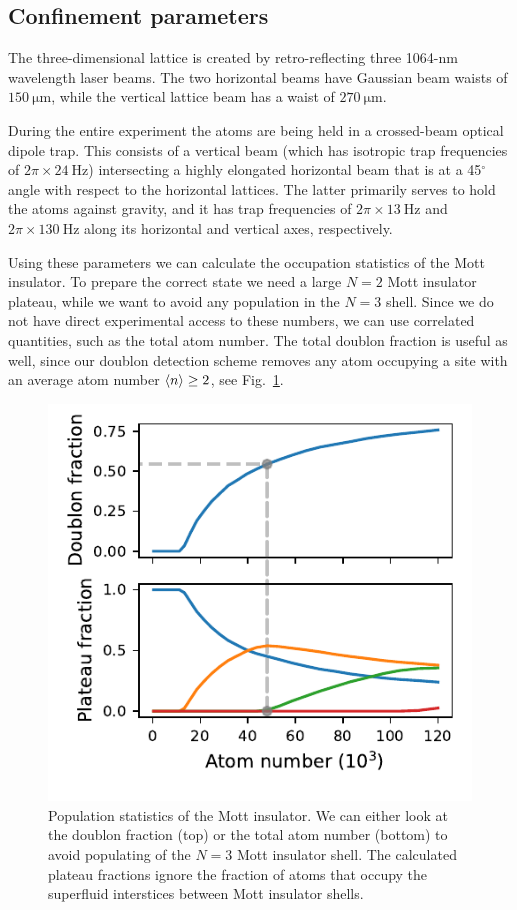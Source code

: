\documentclass[aps,prl,twocolumn,superscriptaddress]{revtex4-1}
\begin{document}
\subsection*{Confinement parameters}
The three-dimensional lattice is created by retro-reflecting three 1064-nm wavelength laser beams. The two horizontal beams have Gaussian beam waists of $150~\mathrm{\mu m}$, while the vertical lattice beam has a waist of $270~\mathrm{\mu m}$.

During the entire experiment the atoms are being held in a crossed-beam optical dipole trap. This consists of a vertical beam (which has isotropic trap frequencies of $2\pi \times 24~\mathrm{Hz}$) intersecting a highly elongated horizontal beam that is at a 45$^\circ$ angle with respect to the horizontal lattices. The latter primarily serves to hold the atoms against gravity, and it has trap frequencies of $2\pi \times 13~\mathrm{Hz}$ and $2\pi \times 130~\mathrm{Hz}$ along its horizontal and vertical axes, respectively. 

Using these parameters we can calculate the occupation statistics of the Mott insulator. To prepare the correct state we need a large $N = 2$ Mott insulator plateau, while we want to avoid any population in the $N = 3$ shell. Since we do not have direct experimental access to these numbers, we can use correlated quantities, such as the total atom number. The total doublon fraction is useful as well, since our doublon detection scheme removes any atom occupying a site with an average atom number $\braket{n} \ge 2$, see Fig.~\ref{fig:mott-insulator-summary}.

\begin{figure}
    \centering
    \includegraphics{figs/mott-insulator-summary/mott-insulator-summary.pdf}
    \caption{Population statistics of the Mott insulator. We can either look at the doublon fraction (top) or the total atom number (bottom) to avoid populating of the $N = 3$ Mott insulator shell. The calculated plateau fractions ignore the fraction of atoms that occupy the superfluid interstices between Mott insulator shells.}
    \label{fig:mott-insulator-summary}
\end{figure}
\end{document}
